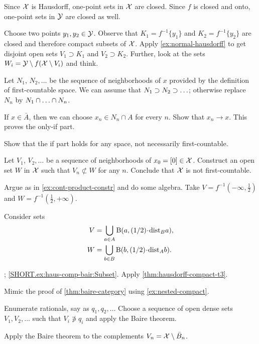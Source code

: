 Since $\mathcal{X}$ is Hausdorff, one-point sets in $\mathcal{X}$ are closed.
Since $f$ is closed and onto, one-point sets in $\mathcal{Y}$ are closed as well.

Choose two points $y_1,y_2\in\mathcal{Y}$.
Observe that $K_1=f^{-1}\{y_1\}$ and $K_2=f^{-1}\{y_2\}$ are closed and therefore compact subsets of $\mathcal{X}$.
Apply \ref{ex:normal-hausdorff} to get disjoint open sets $V_1\supset K_1$ and $V_2\supset K_2$.
Further, look at the sets $W_i=\mathcal{Y}\setminus f(\mathcal{X}\setminus V_i)$ and think.

Let $N_1$, $N_2,\ldots$ be the sequence of neighborhoods of $x$ provided by the definition of first-countable space.
We can assume that $N_1\z\supset N_2\supset \z\ldots$; otherwise replace $N_n$ by $N_1\cap\z\ldots\cap N_n$.

If $x\in\bar A$, then we can choose $x_n\in N_n\cap A$ for every $n$.
Show that $x_n\to x$.
This proves the only-if part.

Show that the if part holds for any space, not necessarily first-countable.

Let $V_1$, $V_2,\ldots$ be a sequence of neighborhoods of $x_0=[0]\in \mathcal{X}$.
Construct an open set $W$ in $\mathcal{X}$ such that $V_n\not\subset W$ for any $n$.
Conclude that $\mathcal{X}$ is not first-countable.

Argue as in \ref{ex:cont-product-constr} and do some algebra.
Take $V=f^{-1}(-\infty,\frac12)$ and $W=f^{-1}(\frac12,+\infty)$.

Consider sets
\begin{align*}
V&=\bigcup_{a\in A} \Ball(a,\tfrac12\cdot \dist_Ba),
\\
W&=\bigcup_{b\in B} \Ball(b,\tfrac12\cdot \dist_Ab).
\end{align*}

\parbf{\ref{ex:haus-comp-bair}};
\ref{SHORT.ex:haus-comp-bair:Subset}. Apply \ref{thm:hausdorff-compact-t3}.

Mimic the proof of \ref{thm:baire-category} using \ref{ex:nested-compact}.

 Enumerate rationals, say as $q_1,q_2,\ldots$
Choose a sequence of open dense sets $V_1,V_2,\ldots$ such that $V_i\not\ni q_i$ and apply the Baire theorem.

Apply the Baire theorem to the complements $V_n=\mathcal{X}\setminus\bar B_n$.

